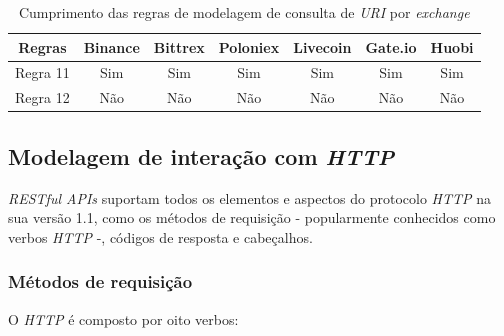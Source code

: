 \begin{table}[h]
    \centering
    \begin{tabular}{|c|c|c|c|c|c|c|}
        \hline
        \textbf{Regras} & \textbf{Binance} & \textbf{Bittrex} & \textbf{Poloniex} & \textbf{Livecoin} & \textbf{Gate.io} & \textbf{Huobi} \\ \hline
        Regra 11        & Sim              & Sim              & Sim               & Sim               & Sim              & Sim            \\ \hline
        Regra 12        & Não              & Não              & Não               & Não               & Não              & Não            \\ \hline
    \end{tabular}
    \caption{Cumprimento das regras de modelagem de consulta de \textit{URI} por \textit{exchange}}
    \label{tab:table-3}
\end{table}


\subsection{Modelagem de interação com \textit{HTTP}}

\textit{RESTful APIs} suportam todos os elementos e aspectos do protocolo \textit{HTTP} na sua versão 1.1, como os métodos de requisição - popularmente conhecidos como verbos \textit{HTTP} -, códigos de resposta e cabeçalhos.


\subsubsection{Métodos de requisição}

O \textit{HTTP} é composto por oito verbos:


